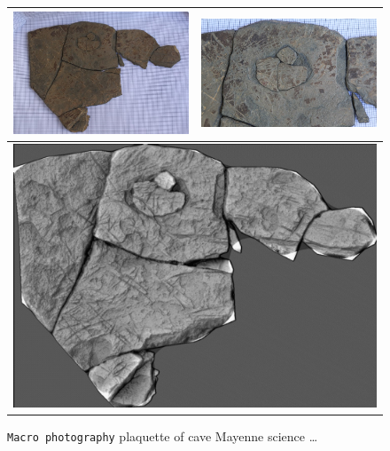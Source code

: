 \begin{figure}
\begin{tabular}{||c|c||}
   \hline \hline 
   \includegraphics[width=80mm]{FIGS/SAMPLES/Doc-Pijo1.jpg}&
   \includegraphics[width=80mm]{FIGS/SAMPLES/Doc-Pijo2.jpg} \\ \hline  \hline 
    \multicolumn{2}{|c|}{\includegraphics[width=150mm]{FIGS/SAMPLES/Doc-Pijo3.jpg}}  \\ \hline  \hline
\end{tabular}
\caption{{\tt Macro photography} plaquette of cave Mayenne science \dots}
\end{figure}











